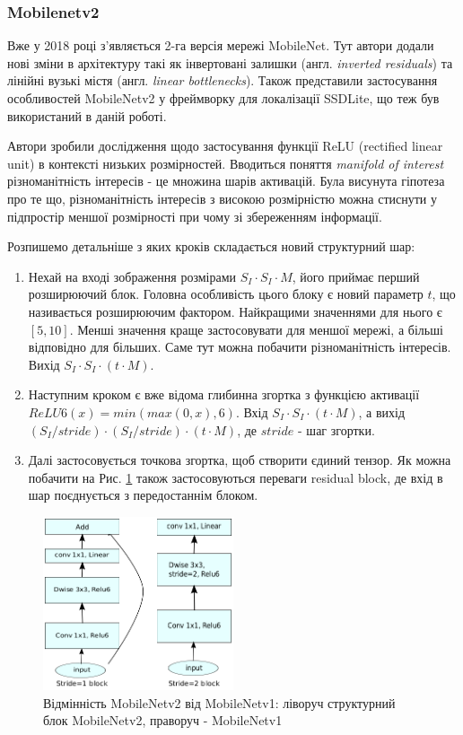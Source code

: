 \subsubsection{Mobilenetv2}

Вже у 2018 році з'являється 2-га версія мережі MobileNet. Тут автори додали нові зміни в
архітектуру такі як інвертовані залишки (англ. \textit{inverted residuals}) та 
лінійні вузькі містя (англ. \textit{linear bottlenecks}). Також представили застосування
особливостей MobileNetv2 у фреймворку для локалізації SSDLite, що теж був використаний
в даній роботі.

Автори зробили дослідження щодо застосування функції ReLU (rectified linear unit) в
контексті низьких розмірностей. Вводиться поняття \textit{manifold of interest}
різноманітність інтересів - це множина шарів активацій. Була висунута гіпотеза про те що,
різноманітність інтересів з високою розмірністю можна стиснути у підпростір меншої розмірності при
чому зі збереженням інформації.

Розпишемо детальніше з яких кроків складається новий структурний шар:


\begin{enumerate}
    \item Нехай на вході зображення розмірами $S_I · S_I · M$, його приймає перший розширюючий блок.
          Головна особливість цього блоку є новий параметр $t$, що називається розширюючим фактором.
          Найкращими значеннями для нього є $[5,10]$. Менші значення краще застосовувати для меншої мережі,
          а більші відповідно для більших. Саме тут можна побачити різноманітність інтересів.
          Вихід $S_I · S_I · (t·M)$.
    \item Наступним кроком є вже відома глибинна згортка з функцією активації $ReLU6(x) =  min(max(0,x),6)$.
          Вхід $S_I · S_I · (t·M)$, а вихід $(S_I/stride) · (S_I/stride) · (t·M)$, де  $stride$ - шаг згортки.
    \item Далі застосовується точкова згортка, щоб створити єдиний тензор. Як можна побачити на
          Рис. \ref{fig:cnn:mobilenetv2_layer} також застосовуються переваги residual block, де вхід в шар
          поєднується з передостаннім блоком.
\end{enumerate}


\begin{figure}[H]
    \centering
    \includegraphics[width=0.5\textwidth]{images/cnn_mobilenetv2_layer}
    \caption{Відмінність MobileNetv2 від MobileNetv1: ліворуч структурний блок MobileNetv2,
        праворуч - MobileNetv1   \cite{mobilenetv2}
        \label{fig:cnn:mobilenetv2_layer}
    }
\end{figure}

